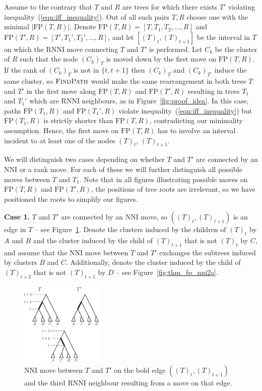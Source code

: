 \documentclass[11pt]{amsart}
\newcommand{\rnni}{\mathrm{RNNI}}
\newcommand{\findpath}{\textsc{FindPath}}
\newcommand{\nni}{\mathrm{NNI}}
\newcommand{\fp}{\mathrm{FP}}
\begin{document}
Assume to the contrary that $T$ and $R$ are trees for which there exists $T'$ violating inequality~(\ref{eqn:iff_inequality}).
Out of all such pairs $T, R$ choose one with the minimal $|\fp(T, R)|$.
Denote $\fp(T,R) = [T, T_1, T_2, \ldots, R]$ and $\fp(T', R) = [T', T_1', T_2', \ldots, R]$, and let $[(T)_t, (T)_{t+1}]$ be the interval in $T$ on which the $\rnni$ move connecting $T$ and $T'$ is performed.
Let $C_k$ be the cluster of $R$ such that the node $(C_k)_T$ is moved down by the first move on $\fp(T, R)$.
If the rank of $(C_k)_T$ is not in $\{t, t+1\}$ then $(C_k)_T$ and $(C_k)_{T'}$ induce the same cluster, so $\findpath$ would make the same rearrangement in both trees $T$ and $T'$ in the first move along $\fp(T, R)$ and $\fp(T', R)$ resulting in trees $T_1$ and $T_1'$ which are $\rnni$ neighbours, as in Figure~\ref{fig:proof_idea}.
In this case, paths $\fp(T_1, R)$ and $\fp(T_1', R)$ violate inequality~(\ref{eqn:iff_inequality}) but $\fp(T_1, R)$ is strictly shorter than $\fp(T, R)$, contradicting our minimality assumption.
Hence, the first move on $\fp(T, R)$ has to involve an interval incident to at least one of the nodes $(T)_t$, $(T)_{t+1}$.

We will distinguish two cases depending on whether $T$ and $T'$ are connected by an $\nni$ or a rank move.
For each of these we will further distinguish all possible moves between $T$ and $T_1$.
Note that in all figures illustrating possible moves on $\fp(T,R)$ and $\fp(T',R)$, the positions of tree roots are irrelevant, so we have positioned the roots to simplify our figures.

\textbf{Case 1.}
$T$ and $T'$ are connected by an $\nni$ move, so $((T)_t,(T)_{t+1})$ is an edge in $T$ -- see Figure~\ref{fig:thm_fp_nni1}.
Denote the clusters induced by the children of $(T)_t$ by $A$ and $B$ and the cluster induced by the child of $(T)_{t+1}$ that is not $(T)_t$ by $C$, and assume that the $\nni$ move between $T$ and $T'$ exchanges the subtrees induced by clusters $B$ and $C$.
Additionally, denote the cluster induced by the child of $(T)_{t+2}$ that is not $(T)_{t+1}$ by $D$ -- see Figure~\ref{fig:thm_fp_nni2a}.

\begin{figure}[ht]
\centering
\includegraphics[width=0.35\textwidth]{thm_fp_nni1}
\caption{$\nni$ move between $T$ and $T'$ on the bold edge $((T)_t,(T)_{t+1})$ and the third $\rnni$ neighbour resulting from a move on that edge.}
\label{fig:thm_fp_nni1}
\end{figure}
\end{document}
